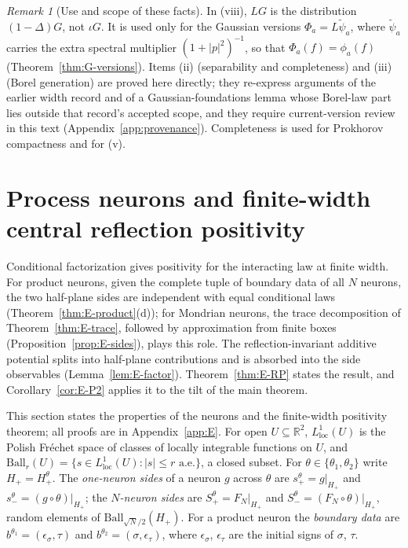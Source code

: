 \documentclass[11pt]{article}
\theoremstyle{plain}
\theoremstyle{definition}
\theoremstyle{remark}
\newtheorem{remark}[theorem]{Remark}
\newcommand{\R}{\mathbb{R}}
\newcommand{\Ball}{\mathrm{Ball}}
\begin{document}
\begin{remark}[Use and scope of these facts]\label{rem:space-scope}
In (viii), $LG$ is the distribution $(1-\Delta)G$, not $\iota G$. It is used only
for the Gaussian versions $\Phi_a=L\tilde\psi_a$, where $\tilde\psi_a$ carries the
extra spectral multiplier $(1+|p|^{2})^{-1}$, so that $\Phi_a(f)=\phi_a(f)$
(Theorem~\ref{thm:G-versions}). Items (ii) (separability and completeness) and
(iii) (Borel generation) are proved here directly; they
re-express arguments of the earlier width record and of a Gaussian-foundations
lemma whose Borel-law part lies outside that record's accepted scope, and they
require current-version review in this text (Appendix~\ref{app:provenance}).
Completeness is used for Prokhorov compactness and for (v).
\end{remark}

\section{Process neurons and finite-width central reflection positivity}\label{sec:endpoint}

Conditional factorization gives positivity for the interacting law at finite width. For product neurons, given the complete tuple of boundary data of all $N$ neurons, the two half-plane sides are independent with equal conditional laws (Theorem~\ref{thm:E-product}(d)); for Mondrian neurons, the trace decomposition of Theorem~\ref{thm:E-trace}, followed by approximation from finite boxes (Proposition~\ref{prop:E-sides}), plays this role. The reflection-invariant additive potential splits into half-plane contributions and is absorbed into the side observables (Lemma~\ref{lem:E-factor}). Theorem~\ref{thm:E-RP} states the result, and Corollary~\ref{cor:E-P2} applies it to the tilt of the main theorem.

This section states the properties of the neurons and the finite-width
positivity theorem; all proofs are in Appendix~\ref{app:E}. For open
$U\subseteq\R^{2}$, $L^{1}_{\mathrm{loc}}(U)$ is the Polish Fr\'echet space of classes of
locally integrable functions on $U$, and
$\Ball_r(U)=\{s\in L^{1}_{\mathrm{loc}}(U):|s|\le r\text{ a.e.}\}$, a closed subset.
For $\theta\in\{\theta_1,\theta_2\}$ write $H_+=H^{\theta}_+$. The \emph{one-neuron sides} of
a neuron $g$ across $\theta$ are $s^{\theta}_{+}=g|_{H_+}$ and $s^{\theta}_{-}=(g\circ\theta)|_{H_+}$;
the \emph{$N$-neuron sides} are $S^{\theta}_{+}=F_N|_{H_+}$ and
$S^{\theta}_{-}=(F_N\circ\theta)|_{H_+}$, random elements of $\Ball_{\sqrt N/2}(H_+)$. For a
product neuron the \emph{boundary data} are $b^{\theta_1}=(\epsilon_\sigma,\tau)$ and
$b^{\theta_2}=(\sigma,\epsilon_\tau)$, where $\epsilon_\sigma$, $\epsilon_\tau$ are the initial
signs of $\sigma$, $\tau$.
\end{document}
